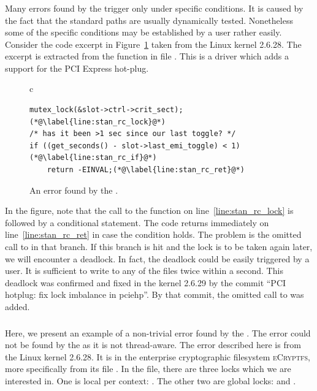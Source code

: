 \subsubsection{\AC}
Many errors found by the \AC trigger only under specific conditions. It is
caused by the fact that the standard paths are usually dynamically tested.
Nonetheless some of the specific conditions may be established by a user
rather easily.  Consider the code excerpt in Figure~\ref{fig:stan_ac_bug}
taken from the Linux kernel 2.6.28. The excerpt is extracted from the
 function in file
. This is a driver which adds a
support for the PCI Express hot-plug.
\begin{figure}[htb]
  \begin{center}
  \begin{tabular}{c}
  \begin{lstlisting}
mutex_lock(&slot->ctrl->crit_sect);(*@\label{line:stan_rc_lock}@*)
/* has it been >1 sec since our last toggle? */
if ((get_seconds() - slot->last_emi_toggle) < 1)(*@\label{line:stan_rc_if}@*)
	return -EINVAL;(*@\label{line:stan_rc_ret}@*)
  \end{lstlisting}
  \end{tabular}
  \end{center}
    \caption{An error found by the \AC.}
    \label{fig:stan_ac_bug}
\end{figure}
In the figure, note that the call to the  function on
line~\ref{line:stan_rc_lock} is followed by a conditional statement. The code
returns immediately on line~\ref{line:stan_rc_ret} in case the condition
holds. The problem is the omitted call to  in that branch.
If this branch is hit and the lock is to be taken again later, we will
encounter a deadlock. In fact, the deadlock could be easily triggered by a
user. It is sufficient to write  to any of the
 files twice within a second.  This deadlock
was confirmed and fixed in the kernel 2.6.29 by the commit ``PCI hotplug: fix
lock imbalance in pciehp''. By that commit, the omitted call to
 was added.

\subsubsection{\TC}
Here, we present an example of a non-trivial error found by the \TC. The error
could not be found by the \AC as it is not thread-aware. The error described
here is from the Linux kernel 2.6.28. It is in the enterprise cryptographic
filesystem \textsc{eCryptfs}, more specifically from its file
. In the file, there are three locks which we
are interested in. One is local per context: . The other
two are global locks:  and
.

